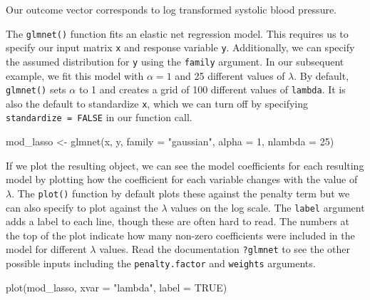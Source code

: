 \documentclass[
  letterpaper,
]{latex/krantz}
\makeatletter
\newenvironment{Shaded}{\begin{snugshade}}{\end{snugshade}}
\newcommand{\AttributeTok}[1]{\textcolor[rgb]{0.40,0.45,0.13}{#1}}
\newcommand{\ConstantTok}[1]{\textcolor[rgb]{0.56,0.35,0.01}{#1}}
\newcommand{\DecValTok}[1]{\textcolor[rgb]{0.68,0.00,0.00}{#1}}
\newcommand{\FunctionTok}[1]{\textcolor[rgb]{0.28,0.35,0.67}{#1}}
\newcommand{\NormalTok}[1]{\textcolor[rgb]{0.00,0.23,0.31}{#1}}
\newcommand{\OtherTok}[1]{\textcolor[rgb]{0.00,0.23,0.31}{#1}}
\newcommand{\SpecialCharTok}[1]{\textcolor[rgb]{0.37,0.37,0.37}{#1}}
\newcommand{\StringTok}[1]{\textcolor[rgb]{0.13,0.47,0.30}{#1}}
\newenvironment{kframe}{%
\medskip{}
\setlength{\fboxsep}{.8em}
 \def\at@end@of@kframe{}%
 \ifinner\ifhmode%
  \def\at@end@of@kframe{\end{minipage}}%
  \begin{minipage}{\columnwidth}%
 \fi\fi%
 \def\FrameCommand##1{\hskip\@totalleftmargin \hskip-\fboxsep
 \colorbox{shadecolor}{##1}\hskip-\fboxsep
     \hskip-\linewidth \hskip-\@totalleftmargin \hskip\columnwidth}%
 \MakeFramed {\advance\hsize-\width
   \@totalleftmargin\z@ \linewidth\hsize
   \@setminipage}}%
 {\par\unskip\endMakeFramed%
 \at@end@of@kframe}
\renewenvironment{Shaded}{\begin{kframe}}{\end{kframe}}
\makeatother
\begin{document}
Our outcome vector corresponds to log transformed systolic blood
pressure.

\begin{Shaded}
\end{Shaded}

The \texttt{glmnet()}
function fits an elastic net regression model. This requires us to
specify our input matrix \texttt{x} and response variable \texttt{y}.
Additionally, we can specify the assumed distribution for \texttt{y}
using the \texttt{family} argument. In our subsequent example, we fit
this model with \(\alpha = 1\) and 25 different values of \(\lambda\).
By default, \texttt{glmnet()} sets \(\alpha\) to 1 and creates a grid of
100 different values of \texttt{lambda}. It is also the default to
standardize \texttt{x}, which we can turn off by specifying
\texttt{standardize\ =\ FALSE} in our function call.

\begin{Shaded}
\begin{Highlighting}[]
\NormalTok{mod\_lasso }\OtherTok{\textless{}{-}} \FunctionTok{glmnet}\NormalTok{(x, y, }\AttributeTok{family =} \StringTok{"gaussian"}\NormalTok{, }\AttributeTok{alpha =} \DecValTok{1}\NormalTok{,}
                    \AttributeTok{nlambda =} \DecValTok{25}\NormalTok{)}
\end{Highlighting}
\end{Shaded}

If we plot the resulting object, we can see the model coefficients for
each resulting model by plotting how the coefficient for each variable
changes with the value of \(\lambda\). The \texttt{plot()}
 function by default plots
these against the penalty term but we can also specify to plot against
the \(\lambda\) values on the log scale. The \texttt{label} argument
adds a label to each line, though these are often hard to read. The
numbers at the top of the plot indicate how many non-zero coefficients
were included in the model for different \(\lambda\) values. Read the
documentation \texttt{?glmnet} to see the other possible inputs
including the \texttt{penalty.factor} and \texttt{weights} arguments.

\begin{Shaded}
\begin{Highlighting}[]
\FunctionTok{plot}\NormalTok{(mod\_lasso, }\AttributeTok{xvar =} \StringTok{"lambda"}\NormalTok{, }\AttributeTok{label =} \ConstantTok{TRUE}\NormalTok{)}
\end{Highlighting}
\end{Shaded}
\end{document}
